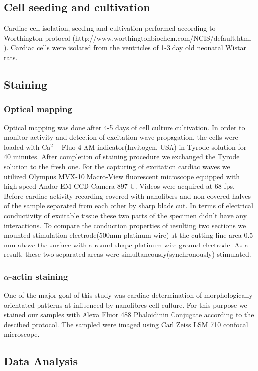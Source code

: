 \subsection{Cell seeding and cultivation}
Cardiac cell isolation, seeding and cultivation performed according to Worthington protocol (http://www.worthingtonbiochem.com/NCIS/default.html ). Cardiac cells were isolated from the ventricles of 1-3 day old neonatal Wistar rats. 
\subsection{Staining}
\subsubsection{Optical mapping}
Optical mapping was done after 4-5 days of cell culture cultivation. In order to monitor activity and detection of excitation wave propagation, the cells were loaded with Ca$^{2+}$ Fluo-4-AM indicator(Invitogen, USA) in Tyrode solution for 40 minutes. After completion of staining procedure we exchanged the Tyrode solution to the fresh one. For the capturing of excitation cardiac waves we utilized Olympus MVX-10 Macro-View fluorescent microscope equipped with high-speed Andor EM-CCD Camera 897-U. Videos were acquired at 68 fps. Before cardiac activity recording covered with nanofibers and non-covered halves of the sample separated from each other by sharp blade cut. In terms of electrical conductivity of excitable tissue these two parts of the specimen didn't have any interactions. To compare the conduction properties of resulting two sections we mounted stimulation electrode(500mm platinum wire) at the cutting-line area 0.5 mm above the surface with a round shape platinum wire ground electrode. As a result, these two separated areas were simultaneously(synchronously) stimulated.
\subsubsection{$\alpha$-actin staining}
One of the major goal of this study was cardiac determination of morphologically orientated patterns at influenced by nanofibres cell culture. For this purpose we stained our samples with Alexa Fluor 488 Phaloidinin Conjugate according to the descibed protocol\cite{Orlova2011}. The sampled were imaged using Carl Zeiss LSM 710 confocal microscope. 
\subsection{Data Analysis}
